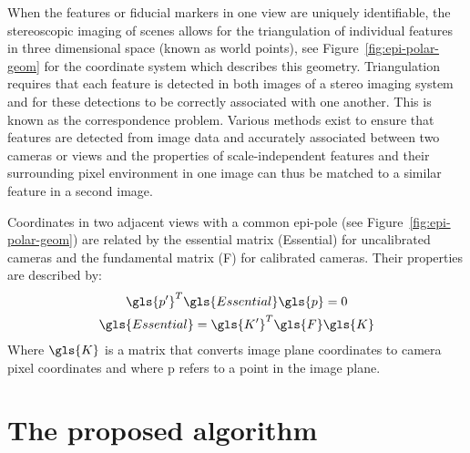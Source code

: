 \documentclass[times, twoside, watermark]{zHenriquesLab-StyleBioRxiv}
\begin{document}


When the features or fiducial markers in one view are uniquely identifiable, the stereoscopic imaging of scenes allows for the triangulation of individual features in three dimensional space (known as world points), see Figure~\ref{fig:epi-polar-geom} for the coordinate system which describes this geometry. %
Triangulation requires that each feature is detected in both images of a stereo imaging system and for these detections to be correctly associated with one another.
This is known as the correspondence problem.
Various methods exist to ensure that features are detected from image data and accurately associated between two cameras or views \cite{?} and the properties of scale-independent features and their surrounding pixel environment in one image can thus be matched to a similar feature in a second image.

Coordinates in two adjacent views with a common epi-pole (see Figure~\ref{fig:epi-polar-geom}) are related by the essential matrix (\gls{Essential}) for uncalibrated cameras and the fundamental matrix (\gls{F}) for calibrated cameras.
Their properties are described by:
\begin{gather}
\gls{p'}^T \gls{Essential} \gls{p} = 0 \label{eq:pEp}\\
\gls{Essential} = \gls{K'}^T \gls{F} \gls{K} %
\end{gather}
Where \(\gls{K}\) is a matrix that converts image plane coordinates to camera pixel coordinates and where \gls{p} refers to a point in the image plane.

\section{The proposed algorithm}
\end{document}
